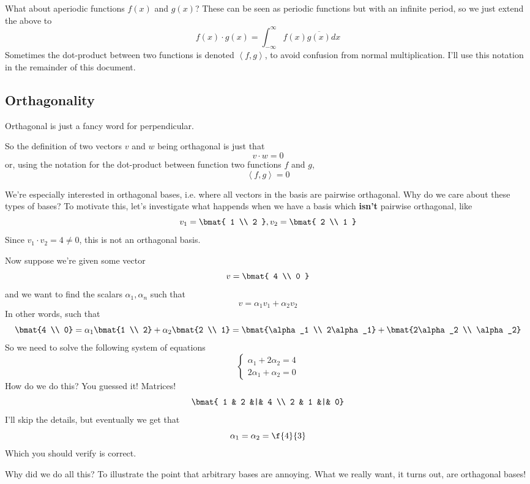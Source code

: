 \documentclass{article}
\newcommand{\0}{{\mathbf{0}}}
\newcommand{\inner}[1]{\left\langle #1 \right\rangle}
\begin{document}
What about aperiodic functions $f(x)$ and $g(x)$? These can be seen as periodic functions but with an infinite
period, so we just extend the above to
$$ f(x) \cdot g(x) = \int^{\infty}_{-\infty} f(x)\overline{g(x)} dx $$
Sometimes the dot-product between two functions is denoted $\inner{f,g}$, to avoid confusion
from normal multiplication. I'll use this notation in the remainder of this document.

\subsection{Orthagonality}
Orthagonal is just a fancy word for perpendicular.

So the definition of two vectors $v$ and $w$ being orthagonal is just that
$$ v \cdot w = 0 $$
or, using the notation for the dot-product between function two functions $f$ and $g$,
$$ \inner{ f, g } = 0 $$

We're especially interested in orthagonal bases, i.e. where all vectors
in the basis are pairwise orthagonal.
Why do we care about these types of bases? To motivate this, let's investigate
what happends when we have a basis which \textbf{isn't} pairwise orthagonal, like
$$ v_1 = \bmat{ 1 \\ 2 }, v_2 = \bmat{ 2 \\ 1 } $$
Since $v_1 \cdot v_2 = 4 \neq 0$, this is not an orthagonal basis.

Now suppose we're given some vector
$$ v = \bmat{ 4 \\ 0 } $$
and we want to find the scalars $\alpha_1, \alpha_n$ such that
$$ v = \alpha_1 v_1 + \alpha_2 v_2 $$
In other words, such that
$$ \bmat{4 \\ 0} = \alpha_1 \bmat{1 \\ 2} + \alpha_2 \bmat{2 \\ 1} = \bmat{\alpha_1 \\ 2\alpha_1} + \bmat{2\alpha_2 \\ \alpha_2} $$
So we need to solve the following system of equations
$$
\begin{cases}
  \alpha_1 + 2\alpha_2 = 4\\
  2\alpha_1 + \alpha_2 = 0
\end{cases}
$$
How do we do this? You guessed it! Matrices!
$$ \bmat{ 1 & 2 &|& 4 \\ 2 & 1 &|& 0} $$
I'll skip the details, but eventually we get that
$$ \alpha_1 = \alpha_2 = \f{4}{3}  $$
Which you should verify is correct.

Why did we do all this? To illustrate the point that arbitrary bases are annoying.
What we really want, it turns out, are orthagonal bases!
\end{document}

